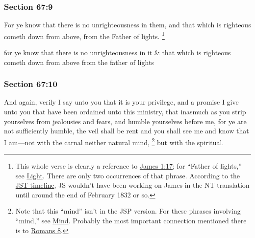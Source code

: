	\subsubsection{Section 67:9} %
		\label{DC67-9}

		For ye know that there is no unrighteousness in them, and that which is righteous cometh down from above, from the Father of lights.%
			\footnote{%
				This whole verse is clearly a reference to \hyperref[JAMES-1-17]{James 1:17}; for ``Father of lights,'' see \hyperref[LIGHT-PHRASES]{Light}. There are only two occurrences of that phrase. According to the \hyperref[JST-TIMELINE]{JST timeline}, JS wouldn't have been working on James in the NT translation until around the end of February 1832 or so.
				}

		\begin{framed}
		\scriptsize
			\begin{compactdesc}
				\item[JSP] for ye know that there is no unrighteousness in it \& that which is righteous cometh down from above from the father of lights
			\end{compactdesc}
		\end{framed}

	\subsubsection{Section 67:10} %
		\label{DC67-10}

		And again, verily I say unto you that it is your privilege, and a promise I give unto you that have been ordained unto this ministry, that inasmuch as you strip yourselves from jealousies and fears, and humble yourselves before me, for ye are not sufficiently humble, the veil shall be rent and you shall see me and know that I am---not with the carnal neither natural mind,%
			\footnote{%
				Note that this ``mind'' isn't in the JSP version. For these phrases involving ``mind,'' see \hyperref[MIND-PHRASES]{Mind}. Probably the most important connection mentioned there is to \hyperref[ROMANS-8]{Romans 8}.
				}
		but with the spiritual.

